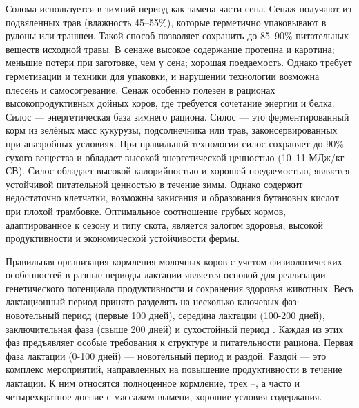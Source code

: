 Солома используется в зимний период как замена части сена.
Сенаж получают из подвяленных трав (влажность 45–55\%), которые герметично упаковывают в рулоны или траншеи. Такой способ позволяет сохранить до 85–90\% питательных веществ исходной травы.
В сенаже высокое содержание протеина и каротина; меньшие потери при заготовке, чем у сена; хорошая поедаемость. Однако требует герметизации и техники для упаковки, и нарушении технологии возможна плесень и самосогревание.
Сенаж особенно полезен в рационах высокопродуктивных дойных коров, где требуется сочетание энергии и белка. Силос --- энергетическая база зимнего рациона.
Силос --- это ферментированный корм из зелёных масс кукурузы, подсолнечника или трав, законсервированных при анаэробных условиях. При правильной технологии силос сохраняет до 90\% сухого вещества и обладает высокой энергетической ценностью (10–11 МДж/кг СВ).
Силос обладает высокой калорийностью и хорошей поедаемостью, является устойчивой питательной ценностью в течение зимы.
Однако содержит недостаточно клетчатки, возможны закисания и образования бутановых кислот при плохой трамбовке. Оптимальное соотношение грубых кормов, адаптированное к сезону и типу скота, является залогом здоровья, высокой продуктивности и экономической устойчивости фермы. \cite{rosstip2025}

Правильная организация кормления молочных коров с учетом физиологических особенностей в разные периоды лактации является основой для реализации генетического потенциала продуктивности и сохранения здоровья животных. Весь лактационный период принято разделять на несколько ключевых фаз: новотельный период (первые 100 дней), середина лактации (100-200 дней), заключительная фаза (свыше 200 дней) и сухостойный период . Каждая из этих фаз предъявляет особые требования к структуре и питательности рациона.
Первая фаза лактации (0-100 дней) --- новотельный период и раздой. Раздой --- это комплекс мероприятий, направленных на повышение
продуктивности в течение лактации. К ним относятся полноценное
кормление, трех –, а часто и четырехкратное доение с массажем вымени, хорошие условия содержания.
